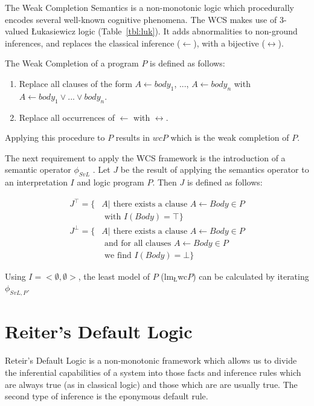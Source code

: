 \documentclass[
11pt, %
english, %
singlespacing, %
headsepline, %
]{MastersDoctoralThesis} %
\begin{document}
The Weak Completion Semantics is a non-monotonic logic which procedurally encodes several well-known cognitive phenomena. The WCS makes use of 3-valued \L ukasiewicz logic (Table~\ref{tbl:luk}). It adds abnormalities to non-ground inferences, and replaces the classical inference ($\leftarrow$), with a bijective ($\leftrightarrow$). 

The Weak Completion of a program $P$ is defined as follows:

\begin{enumerate}
\item Replace all clauses of the form $A \leftarrow body_1$, ..., $A \leftarrow body_n$ with $A \leftarrow body_1 \lor ... \lor body_n$.
\item Replace all occurrences of $\leftarrow$ with $\leftrightarrow$.
\end{enumerate}

Applying this procedure to $P$ results in $wcP$ which is the weak completion of $P$.

The next requirement to apply the WCS framework is the introduction of a semantic operator $\phi_{SvL}$ \citep{stenning2008interpretation}. Let $J$ be the result of applying the semantics operator to an interpretation $I$ and logic program $P$. Then $J$ is defined as follows:

\[
\begin{split}
J^\top = \{ & A | \textrm{ there exists a clause } A\leftarrow Body \in P \\ & \textrm{ with } I(Body) = \top\}
\end{split}
\]
\[
\begin{split}
J^\bot = \{ &  A | \textrm{ there exists a clause } A \leftarrow Body \in P \\
           & \textrm{ and for all clauses } A \leftarrow Body \in P \\ & \textrm{ we find } I(Body) = \bot\}
\end{split}
\]

Using $I=<\emptyset, \emptyset>$, the least model of $P$ ($\textrm{lm}_\textrm{\L}$wc$P$) can be calculated by iterating $\phi_{SvL,P}$.

\section{Reiter's Default Logic}
Reteir's Default Logic \citep{reiter1980logic} is a non-monotonic framework which allows us to divide the inferential capabilities of a system into those facts and inference rules which are always true (as in classical logic) and those which are are usually true. The second type of inference is the eponymous default rule.
\end{document}
